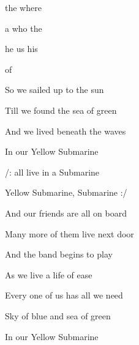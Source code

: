 

\zs
{} the  where  

 a  who  the 

 he  us  his 

  of 
\ks

\zs
So we sailed up to the sun

Till we found the sea of green

And we lived beneath the waves

In our Yellow Submarine
\ks

\zr
/:  all live in a  Submarine

Yellow Submarine,  Submarine :/
\kr

\zs
And our friends are all on board

Many more of them live next door

And the band begins to play
\ks

\zr  \kr

\zs
As we live a life of ease

Every one of us has all we need

Sky of blue and sea of green

In our Yellow Submarine
\ks

\zr  \kr   \zr  \kr

\kp





